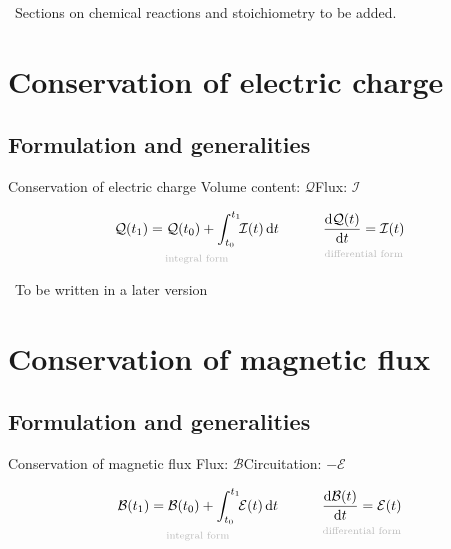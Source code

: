 \documentclass[a4paper,12pt,%
onecolumn,oneside,%
british%
]{memoir}
\newcommand{\mynotew}[1]{{\footnotesize\color{midgrey}\faIcon{tools}\ #1}}
\newcommand*{\di}{\mathrm{d}}%
\renewcommand*{\|}[1][]{\nonscript\:#1\vert\nonscript\:\mathopen{}}
\newcommand*{\yti}{t_{0}}
\newcommand*{\ytf}{t_{1}}
\newcommand*{\yC}{\mathcal{Q}}
\newcommand*{\yI}{\mathcal{I}}
\newcommand*{\yBf}{\mathcal{B}}
\newcommand*{\yEv}{\mathcal{E}}
\begin{document}
\mynotew{Sections on chemical reactions and stoichiometry to be added.}

\printpagenotes*
\clearpage
\chapter{Conservation of electric charge}
\label{cha:cons_charge}

\section{Formulation and generalities}
\label{sec:cons_charge_formulation}

\begin{definition}{Conservation of electric charge}
  Volume content: $\yC$\qquad Flux: $\yI$

  \begin{equation}
    \label{eq:cons_charge}
    \underbracket[0pt]{\yC(\ytf) =
      \yC(\yti) +
      \int_{\yti}^{\ytf}\!\!\yI(t)\,\di t}_{\mathclap{\text{\color{grey}integral form}}}
      \qquad\quad
      \underbracket[0pt]{\frac{\di\yC(t)}{\di t} =
        \yI(t)}_{\mathclap{\text{\color{grey}differential form}}}
  \end{equation}
\end{definition}


\mynotew{To be written in a later version}


\printpagenotes*
\clearpage
\chapter{Conservation of magnetic flux}
\label{cha:cons_magneticflux}

\section{Formulation and generalities}
\label{sec:cons_magneticflux_formulation}

\begin{definition}{Conservation of magnetic flux}
  Flux: $\yBf$\qquad Circuitation: $-\yEv$

  \begin{equation}
    \label{eq:cons_magneticflux}
    \underbracket[0pt]{\yBf(\ytf) =
      \yBf(\yti) +
      \int_{\yti}^{\ytf}\!\!\yEv(t)\,\di t}_{\mathclap{\text{\color{grey}integral form}}}
      \qquad\quad
      \underbracket[0pt]{\frac{\di\yBf(t)}{\di t} =
        \yEv(t)}_{\mathclap{\text{\color{grey}differential form}}}
  \end{equation}
\end{definition}
\end{document}
